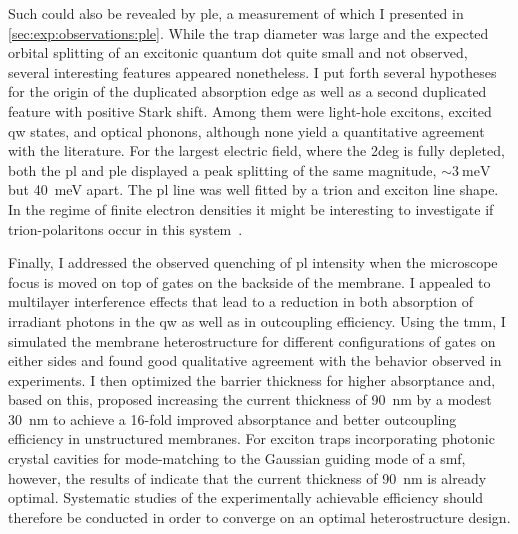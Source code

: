 Such could also be revealed by \acrfull{ple}, a measurement of which I presented in \cref{sec:exp:observations:ple}.
While the trap diameter was large and the expected orbital splitting of an excitonic quantum dot quite small and not observed, several interesting features appeared nonetheless.
I put forth several hypotheses for the origin of the duplicated absorption edge as well as a second duplicated feature with positive Stark shift.
Among them were light-hole excitons, excited \gls{qw} states, and optical phonons, although none yield a quantitative agreement with the literature.
For the largest electric field, where the \gls{2deg} is fully depleted, both the \gls{pl} and \gls{ple} displayed a peak splitting of the same magnitude, $\sim\qty{3}{\milli\electronvolt}$ but \qty{40}{\milli\electronvolt} apart.
The \gls{pl} line was well fitted by a trion and exciton line shape.
In the regime of finite electron densities it might be interesting to investigate if trion-polaritons occur in this system~\cite{Baeten2015,Glazov2020,Huang2023b}.

Finally, I addressed the observed quenching of \gls{pl} intensity when the microscope focus is moved on top of gates on the backside of the membrane.
I appealed to multilayer interference effects that lead to a reduction in both absorption of irradiant photons in the \gls{qw} as well as in outcoupling efficiency.
Using the \acrfull{tmm}, I simulated the membrane heterostructure for different configurations of gates on either sides and found good qualitative agreement with the behavior observed in experiments.
I then optimized the  barrier thickness for higher absorptance and, based on this, proposed increasing the current thickness of \qty{90}{\nano\meter} by a modest \qty{30}{\nano\meter} to achieve a \num{16}-fold improved absorptance and better outcoupling efficiency in unstructured membranes.
For exciton traps incorporating photonic crystal cavities for mode-matching to the Gaussian guiding mode of a \gls{smf}, however, the results of \citet{Wu2020} indicate that the current thickness of \qty{90}{\nano\meter} is already optimal.
Systematic studies of the experimentally achievable efficiency should therefore be conducted in order to converge on an optimal heterostructure design.

